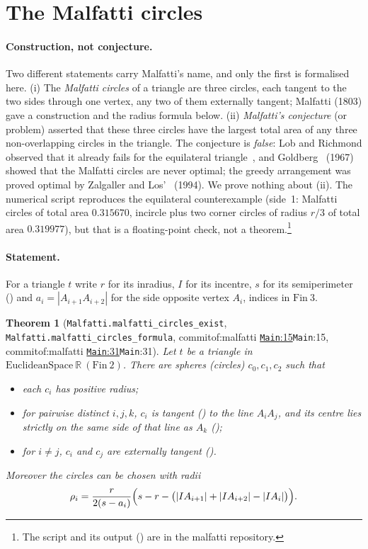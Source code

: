 \documentclass[11pt]{article}
\newtheorem{theorem}{Theorem}
\theoremstyle{definition}
\theoremstyle{remark}
\newcommand{\RR}{\mathbb{R}}
\newcommand{\commitof}[1]{\csname commitof:#1\endcsname}
\newcommand{\repo}[1]{https://github.com/jpbald93/#1}
\newcommand{\src}[4]{\ifcsname commitof:#1\endcsname
  \href{\repo{#1}/blob/\commitof{#1}/#2/#3.lean\#L#4}{\texttt{#3}:#4}\else\texttt{#3}:#4\fi}
\begin{document}
\section{The Malfatti circles}\label{sec:malfatti}

\paragraph{Construction, not conjecture.} Two different statements carry Malfatti's name, and
only the first is formalised here. (i) The \emph{Malfatti circles} of a triangle are three
circles, each tangent to the two sides through one vertex, any two of them externally tangent;
Malfatti (1803) gave a construction and the radius formula below. (ii) \emph{Malfatti's
conjecture} (or problem) asserted that these three circles have the largest total area of any
three non-overlapping circles in the triangle. The conjecture is \emph{false}: Lob and Richmond
observed that it already fails for the equilateral triangle~\cite{LobRichmond}, and
Goldberg~\cite{Goldberg} (1967) showed that the Malfatti circles are never optimal; the greedy
arrangement was proved optimal by Zalgaller and Los'~\cite{ZalgallerLos} (1994). We prove nothing about (ii). The numerical script 
reproduces the equilateral counterexample (side~1: Malfatti circles of total area $0.315670$,
incircle plus two corner circles of radius $r/3$ of total area $0.319977$), but that is a
floating-point check, not a theorem.\footnote{The script and its output
() are in the malfatti repository.}

\paragraph{Statement.} For a triangle $t$ write $r$ for its inradius, $I$ for its incentre,
$s$ for its semiperimeter () and $a_i=|A_{i+1}A_{i+2}|$ for the side opposite
vertex $A_i$, indices in $\mathrm{Fin}\ 3$.

\begin{theorem}[\texttt{Malfatti.malfatti\_circles\_exist}, \texttt{Malfatti.malfatti\_circles\_formula}, \src{malfatti}{Malfatti}{Main}{15}, \src{malfatti}{Malfatti}{Main}{31}]\label{thm:malfatti}
Let $t$ be a triangle in $\mathrm{EuclideanSpace}\ \RR\ (\mathrm{Fin}\ 2)$. There are spheres
(circles) $c_0,c_1,c_2$ such that
\begin{itemize}
\item each $c_i$ has positive radius;
\item for pairwise distinct $i,j,k$, $c_i$ is tangent () to the line
$A_iA_j$, and its centre lies strictly on the same side of that line as $A_k$
();
\item for $i\ne j$, $c_i$ and $c_j$ are externally tangent ().
\end{itemize}
Moreover the circles can be chosen with radii
\[
\rho_i=\frac{r}{2(s-a_i)}\Bigl(s-r-\bigl(|IA_{i+1}|+|IA_{i+2}|-|IA_i|\bigr)\Bigr).
\]
\end{theorem}
\end{document}
